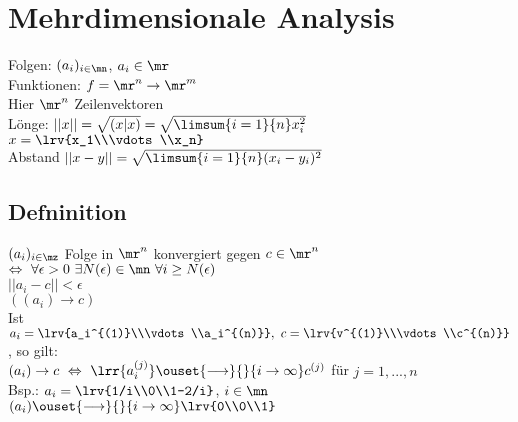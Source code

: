 \newpage
\section{Mehrdimensionale Analysis}
	Folgen: $ (a_i)_{i\in\mn} $, $ a_i\in\mr $\\
	Funktionen: $ f=\mr^n\rightarrow\mr^m $\\
	Hier $ \mr^n $ Zeilenvektoren\\
	Lönge: $ ||x||=\sqrt{(x|x)}=\sqrt{\limsum{i=1}{n}x_i^2} $\\
	$ x=\lrv{x_1\\\vdots\\x_n} $\\
	Abstand $ ||x-y||=\sqrt{\limsum{i=1}{n}(x_i-y_i)^2} $
	
\subsection{Defninition}
	$ (a_i)_{i\in\mz} $ Folge in $ \mr^n $ konvergiert gegen $ c\in\mr^n $\\
	$ \Leftrightarrow\ \forall\epsilon>0\ \exists N(\epsilon)\in\mn\ \forall i\geq N(\epsilon) $\\
	$ ||a_i-c||<\epsilon $\\
	$ ((a_i)\rightarrow c) $\\
	Ist $ a_i=\lrv{a_i^{(1)}\\\vdots\\a_i^{(n)}},\ c=\lrv{v^{(1)}\\\vdots\\c^{(n)}} $, so gilt:\\
	$ (a_i)\rightarrow c\ \Leftrightarrow\ \lrr{a_i^{(j)}}\ouset{\longrightarrow}{}{i\rightarrow\infty}c^{(j)} $ für $ j=1,...,n $\\
	Bsp.: $ a_i=\lrv{1/i\\0\\1-2/i} $, $ i\in\mn $\\
	$ (a_i)\ouset{\longrightarrow}{}{i\rightarrow\infty}\lrv{0\\0\\1} $
	
